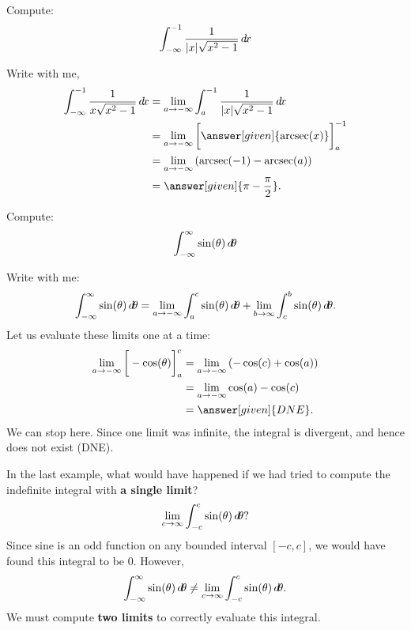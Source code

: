\documentclass{ximera}
\begin{document}
\begin{example}	
  Compute:
  \[
  \int_{-\infty}^{-1}\frac{1}{|x|\sqrt{x^2-1}} \mathop{}\!d\! x
  \]
  \begin{explanation}
    Write with me,
    \begin{align*}
      \int_{-\infty}^{-1} \frac{1}{x\sqrt{x^2-1}} \d x &= \lim_{a \to -\infty} \int_{a}^{-1} \frac{1}{|x|\sqrt{x^2-1}}\d x\\
      &= \lim_{a \to -\infty} \eval{\answer[given]{\arcsec(x)}}_{a}^{-1} \\
      &= \lim_{a \to -\infty} \left(\arcsec(-1) - \arcsec(a)\right)\\
      &= \answer[given]{\pi - \frac{\pi}{2}}.
    \end{align*}
  \end{explanation}
  \end{example}

\begin{example}	
  Compute:
  \[
  \int_{-\infty}^\infty \sin(\theta) \mathop{}\!d\! \theta
  \]
  \begin{explanation}
    Write with me:
    \[
    \int_{-\infty}^\infty \sin(\theta) \mathop{}\!d\! \theta = \lim_{a\to -\infty} \int_a^c \sin(\theta) \mathop{}\!d\! \theta + \lim_{b\to\infty}\int_c^b \sin(\theta) \mathop{}\!d\! \theta.
    \]
    Let us evaluate these limits one at a time:
    \begin{align*}  
      \lim_{a\to -\infty}\eval{-\cos(\theta)}_a^c &= \lim_{a\to -\infty}\left(-\cos(c)+\cos(a)\right)\\
      &= \lim_{a\to -\infty} \cos(a) -\cos(c)\\
      &= \answer[given]{DNE}.
    \end{align*}
    We can stop here. Since one limit was infinite, the integral is
    divergent, and hence does not exist (DNE).
  \end{explanation}
\end{example}


\begin{warning}
In the last example, what would have happened if we had tried to
compute the indefinite integral with \textbf{a single limit}?
\[
\lim_{c\to \infty}\int_{-c}^c \sin(\theta)\mathop{}\!d\! \theta?
\]
Since sine is an odd function on any bounded interval $[-c,c]$, we
would have found this integral to be $0$. However,
\[
\int_{-\infty}^\infty \sin(\theta) \mathop{}\!d\! \theta \ne \lim_{c\to \infty}\int_{-c}^c \sin(\theta)\mathop{}\!d\! \theta.
\]
We must compute \textbf{two limits} to correctly evaluate this
integral.
\end{warning}
\end{document}
